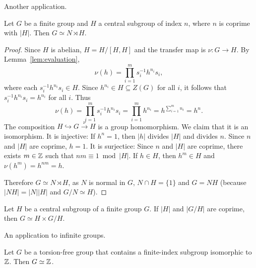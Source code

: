 Another application. 

\begin{proposition}
	\label{prop:semidirecto}
	Let $G$ be a finite group and $H$ a central subgroup of index $n$, where 
	$n$ is coprime with $|H|$. Then
	$G\simeq N\rtimes H$.
\end{proposition}

\begin{proof}
	Since $H$ is abelian, $H=H/[H,H]$ and the transfer map is 
	$\nu\colon G\to H$. By Lemma~\ref{lem:evaluation}, 
	\[
		\nu(h)
		=\prod_{i=1}^m s_i^{-1}h^{n_i}s_i,
	\]
	where each $s_i^{-1}h^{n_i}s_i\in H$. Since 
	$h^{n_i}\in H\subseteq Z(G)$ for all $i$, it follows that 
	$s_i^{-1}h^{n_i}s_i=h^{n_i}$ for all $i$. Thus 
	\[
		\nu(h)
		=\prod_{i=1}^m s_i^{-1}h^{n_i}s_i
		=\prod_{i=1}^mh^{n_i}
		=h^{\sum_{i=1}^m n_i}=h^n.
	\] 
	The composition $H\hookrightarrow G\xrightarrow{\nu} H$ is a group homomorphism. 
	We claim that it is an isomorphism. It is injective: If $h^n=1$, then 
	$|h|$ divides $|H|$ and divides $n$. Since $n$ and $|H|$ are
	coprime, $h=1$. It is surjectice: Since $n$ and $|H|$ are coprime, there exists 
	$m\in\mathbb{Z}$ such that $nm\equiv 1\bmod |H|$. If $h\in H$, then $h^m\in
	H$ and $\nu(h^m)=h^{nm}=h$. 

	Therefore $G\simeq N\rtimes H$, as $N$ is normal in $G$, $N\cap
	H=\{1\}$ and $G=NH$ (because $|NH|=|N||H|$ and $G/N\simeq H$).
\end{proof}

\begin{exercise}
	Let $H$ be a central subgroup of a finite group $G$. If $|H|$
	and $|G/H|$ are coprime, then $G\simeq H\times G/H$.
\end{exercise}



An application to infinite groups. 

\begin{theorem}
	Let $G$ be a torsion-free group that contains a finite-index subgroup isomorphic to  
	$\mathbb{Z}$. Then $G\simeq\mathbb{Z}$.
\end{theorem}

